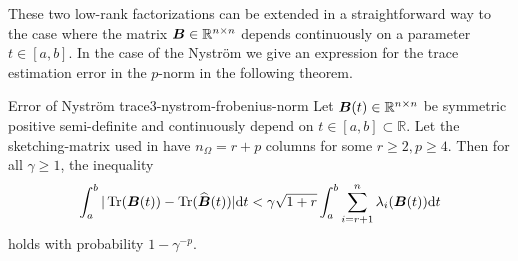 These two low-rank factorizations can be extended in a straightforward way
to the case where the matrix $\boldsymbol{B} \in \mathbb{R}^{n \times n}$ depends
continuously on a parameter $t \in [a, b]$. In the case of the Nystr\"om
we give an expression for the trace estimation error in the $p$-norm in the
following theorem.
\begin{theorem}{Error of Nystr\"om trace}{3-nystrom-frobenius-norm}
    Let $\boldsymbol{B}(t) \in \mathbb{R}^{n \times n}$ be symmetric positive semi-definite
    and continuously depend on $t \in [a,b] \subset \mathbb{R}$. Let the \gls{sketching-matrix}
    used in  have
    $n_{\Omega} = r + p$ columns for some $r \geq 2, p \geq 4$. Then
    for all $\gamma \geq 1$, the inequality
    \begin{equation}
        \int_{a}^{b} | \operatorname{Tr}(\boldsymbol{B}(t)) - \operatorname{Tr}(\widehat{\boldsymbol{B}}(t))| \mathrm{d}t
            < \gamma \sqrt{1 + r} \int_{a}^{b} \sum_{i = r+1}^n \lambda_i(\boldsymbol{B}(t)) \mathrm{d}t
    \end{equation}
    holds with probability $1 - \gamma^{-p}$.
\end{theorem}


